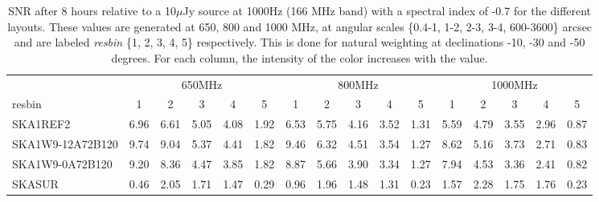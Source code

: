 \begin{table}[!htp]
{{\begin{tabular}{|lccccc||ccccc||ccccc|}
 \tabularnewline \cline{2-16} \multicolumn{1}{c}{ } & \multicolumn{5}{|c}{650MHz}  & \multicolumn{5}{c}{800MHz}  & \multicolumn{5}{c|}{1000MHz} \tabularnewline \cline{1-16} 
 resbin  &1 & 2 & 3 & 4 & 5 & 1 & 2 & 3 & 4 & 5 & 1 & 2 & 3 & 4 & 5 \tabularnewline \hline
SKA1REF2 & 6.96 \cellcolor{blue!47.42} & 6.61 \cellcolor{red!45.40} & 5.05 \cellcolor{green!56.33} & 4.08 \cellcolor{orange!55.29} & 1.92 \cellcolor{purple!60.00} & 6.53 \cellcolor{blue!45.52} & 5.75 \cellcolor{red!54.51} & 4.16 \cellcolor{green!55.15} & 3.52 \cellcolor{orange!59.62} & 1.31 \cellcolor{purple!60.00} & 5.59 \cellcolor{blue!41.95} & 4.79 \cellcolor{red!54.60} & 3.55 \cellcolor{green!56.18} & 2.96 \cellcolor{orange!60.00} & 0.87 \cellcolor{purple!60.00}\\ \hline 
SKA1W9-12A72B120 & 9.74 \cellcolor{blue!60.00} & 9.04 \cellcolor{red!60.00} & 5.37 \cellcolor{green!60.00} & 4.41 \cellcolor{orange!60.00} & 1.82 \cellcolor{purple!57.42} & 9.46 \cellcolor{blue!60.00} & 6.32 \cellcolor{red!60.00} & 4.51 \cellcolor{green!60.00} & 3.54 \cellcolor{orange!60.00} & 1.27 \cellcolor{purple!58.44} & 8.62 \cellcolor{blue!60.00} & 5.16 \cellcolor{red!60.00} & 3.73 \cellcolor{green!60.00} & 2.71 \cellcolor{orange!51.25} & 0.83 \cellcolor{purple!57.38}\\ \hline 
SKA1W9-0A72B120 & 9.20 \cellcolor{blue!57.56} & 8.36 \cellcolor{red!55.91} & 4.47 \cellcolor{green!49.67} & 3.85 \cellcolor{orange!52.00} & 1.82 \cellcolor{purple!57.42} & 8.87 \cellcolor{blue!57.08} & 5.66 \cellcolor{red!53.64} & 3.90 \cellcolor{green!51.54} & 3.34 \cellcolor{orange!56.23} & 1.27 \cellcolor{purple!58.44} & 7.94 \cellcolor{blue!55.95} & 4.53 \cellcolor{red!50.81} & 3.36 \cellcolor{green!52.15} & 2.41 \cellcolor{orange!40.75} & 0.82 \cellcolor{purple!56.72}\\ \hline 
SKASUR & 0.46 \cellcolor{blue!18.00} & 2.05 \cellcolor{red!18.00} & 1.71 \cellcolor{green!18.00} & 1.47 \cellcolor{orange!18.00} & 0.29 \cellcolor{purple!18.00} & 0.96 \cellcolor{blue!18.00} & 1.96 \cellcolor{red!18.00} & 1.48 \cellcolor{green!18.00} & 1.31 \cellcolor{orange!18.00} & 0.23 \cellcolor{purple!18.00} & 1.57 \cellcolor{blue!18.00} & 2.28 \cellcolor{red!18.00} & 1.75 \cellcolor{green!18.00} & 1.76 \cellcolor{orange!18.00} & 0.23 \cellcolor{purple!18.00}\tabularnewline \hline 
\end{tabular}}\hfil 

\caption{SNR after 8 hours relative to a 10$\mu$Jy source at 1000Hz (166 MHz band) with a spectral index of -0.7 for the different layouts. These values are generated at 650, 800 and 1000 MHz, at angular scales \{0.4-1, 1-2, 2-3, 3-4, 600-3600\} arcsec and are labeled {\it resbin} \{1, 2, 3, 4, 5\} respectively. This is done for natural weighting at declinations -10, -30 and -50 degrees. For each column, the intensity of the color increases with the value.}\label{tab:snr10-band1}}
 \end{table}